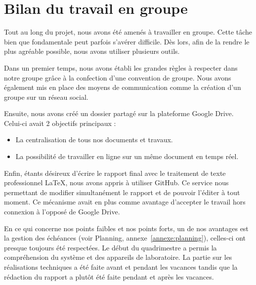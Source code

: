 \section{Bilan du travail en groupe}

Tout au long du projet, nous avons été amenés à travailler en groupe. Cette tâche bien que fondamentale peut parfois s'avérer difficile. Dès lors, afin de la rendre le plus agréable possible, nous avons utiliser plusieurs outils.

Dans un premier temps, nous avons établi les grandes règles à respecter dans notre groupe grâce à la confection d'une convention de groupe. Nous avons également mis en place des moyens de communication comme la création d'un groupe sur un réseau social. 

Ensuite, nous avons créé un dossier partagé sur la plateforme Google Drive. Celui-ci avait 2 objectifs principaux :
\begin{itemize}
\item La centralisation de tous nos documents et travaux.
\item La possibilité de travailler en ligne sur un même document en temps réel.
\end{itemize}

Enfin, étants désireux d'écrire le rapport final avec le traitement de texte professionnel \LaTeX, nous avons appris à utiliser GitHub. Ce service nous permettant de modifier simultanément le rapport et de pouvoir l'éditer à tout moment. Ce mécanisme avait en plus comme avantage d'accepter le travail hors connexion à l'opposé de Google Drive.

En ce qui concerne nos points faibles et nos points forts, un de nos avantages est la gestion des échéances (voir Planning, annexe~\ref{annexe:planning}), celles-ci ont presque toujours été respectées. Le début du quadrimestre a permis la compréhension du système et des appareils de laboratoire. La partie sur les réalisations techniques a été faite avant et pendant les vacances tandis que la rédaction du rapport a plutôt été faite pendant et après les vacances. 

